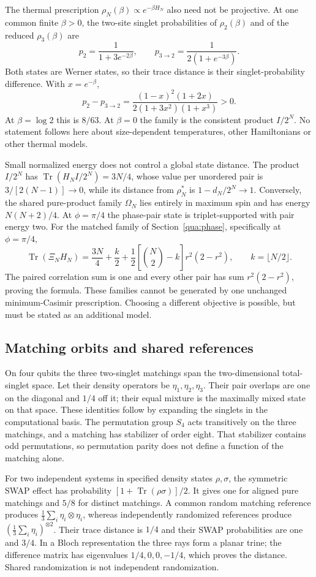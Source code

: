 The thermal prescription $\rho_N(\beta)\propto e^{-\beta H_N}$ also need not be projective. At one common finite $\beta>0$, the two-site singlet probabilities of $\rho_2(\beta)$ and of the reduced $\rho_3(\beta)$ are
\[
 p_2=\frac1{1+3e^{-2\beta}},\qquad
 p_{3\to2}=\frac1{2(1+e^{-3\beta})}.
\]
Both states are Werner states, so their trace distance is their singlet-probability difference. With $x=e^{-\beta}$,
\[
 p_2-p_{3\to2}=\frac{(1-x)^2(1+2x)}{2(1+3x^2)(1+x^3)}>0.
\]
At $\beta=\log2$ this is $8/63$. At $\beta=0$ the family is the consistent product $I/2^N$. No statement follows here about size-dependent temperatures, other Hamiltonians or other thermal models.

Small normalized energy does not control a global state distance. The product $I/2^N$ has $\operatorname{Tr}(H_NI/2^N)=3N/4$, whose value per unordered pair is $3/[2(N-1)]\to0$, while its distance from $\rho_N^*$ is $1-d_N/2^N\to1$. Conversely, the shared pure-product family $\Omega_N$ lies entirely in maximum spin and has energy $N(N+2)/4$. At $\phi=\pi/4$ the phase-pair state is triplet-supported with pair energy two. For the matched family of Section~\ref{qua:phase}, specifically at $\phi=\pi/4$,
\[
 \operatorname{Tr}(\Xi_NH_N)=\frac{3N}{4}+\frac{k}{2}
 +\frac12\left[\binom N2-k\right]r^2(2-r^2),\qquad k=\lfloor N/2\rfloor.
\]
The paired correlation sum is one and every other pair has sum $r^2(2-r^2)$, proving the formula. These families cannot be generated by one unchanged minimum-Casimir prescription. Choosing a different objective is possible, but must be stated as an additional model.

\subsection{Matching orbits and shared references}
\label{qua:references}
On four qubits the three two-singlet matchings span the two-dimensional total-singlet space. Let their density operators be $\eta_1,\eta_2,\eta_3$. Their pair overlaps are one on the diagonal and $1/4$ off it; their equal mixture is the maximally mixed state on that space. These identities follow by expanding the singlets in the computational basis. The permutation group $S_4$ acts transitively on the three matchings, and a matching has stabilizer of order eight. That stabilizer contains odd permutations, so permutation parity does not define a function of the matching alone.

For two independent systems in specified density states $\rho,\sigma$, the symmetric SWAP effect has probability
$[1+\operatorname{Tr}(\rho\sigma)]/2$.
It gives one for aligned pure matchings and $5/8$ for distinct matchings. A common random matching reference produces
$\frac13\sum_i\eta_i\otimes\eta_i$, whereas independently randomized references produce
$(\frac13\sum_i\eta_i)^{\otimes2}$.
Their trace distance is $1/4$ and their SWAP probabilities are one and $3/4$. In a Bloch representation the three rays form a planar trine; the difference matrix has eigenvalues $1/4,0,0,-1/4$, which proves the distance. Shared randomization is not independent randomization.

